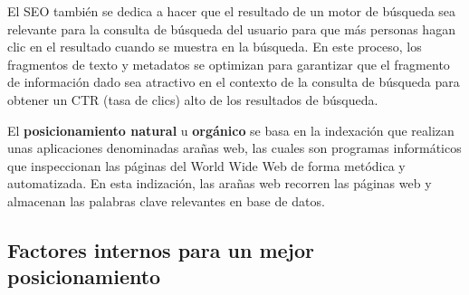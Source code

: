 \documentclass[a4paper,11pt]{scrartcl}
\begin{document}
El SEO también se dedica a hacer que el resultado de un motor de búsqueda sea relevante para la consulta de búsqueda del usuario para que más personas hagan clic en el resultado cuando se muestra en la búsqueda. En este proceso, los fragmentos de texto y metadatos se optimizan para garantizar que el fragmento de información dado sea atractivo en el contexto de la consulta de búsqueda para obtener un CTR (tasa de clics) alto de los resultados de búsqueda.

El \textbf{posicionamiento natural} u \textbf{orgánico}  se basa en la indexación que realizan unas aplicaciones denominadas arañas web, las cuales son programas informáticos que inspeccionan las páginas del World Wide Web de forma metódica y automatizada. En esta indización, las arañas web recorren las páginas web y almacenan las palabras clave relevantes en base de datos.

\subsection{Factores internos para un mejor posicionamiento}
\end{document}
